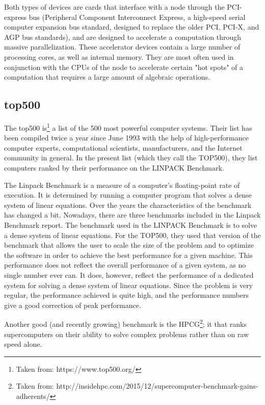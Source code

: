 \documentclass[paper=a4, fontsize=11pt]{scrartcl} %
\numberwithin{equation}{section} %
\numberwithin{figure}{section} %
\numberwithin{table}{section} %
\begin{document}
Both types of devices are cards that interface with a node through the PCI-express bus (Peripheral Component Interconnect Express, a high-speed serial computer expansion bus standard, designed to replace the older PCI, PCI-X, and AGP bus standards), and are designed to accelerate a computation through massive parallelization. These accelerator devices contain a large number of processing cores, as well as internal memory. They are most often used in conjunction with the CPUs of the node to accelerate certain "hot spots" of a computation that requires a large amount of algebraic operations.





\subsection{\textbf{top500}}

The top500 is\footnote{Taken from: https://www.top500.org/} a list of the 500 most powerful computer systems. Their list has been compiled twice a year since June 1993 with the help of high-performance computer experts, computational scientists, manufacturers, and the Internet community in general. In the present list (which they call the TOP500), they list computers ranked by their performance on the LINPACK Benchmark.

The Linpack Benchmark is a measure of a computer's floating-point rate of execution. It is determined by running a computer program that solves a dense system of linear equations. Over the years the characteristics of the benchmark has changed a bit. Nowadays, there are three benchmarks included in the Linpack Benchmark report. The benchmark used in the LINPACK Benchmark is to solve a dense system of linear equations. For the TOP500, they used that version of the benchmark that allows the user to scale the size of the problem and to optimize the software in order to achieve the best performance for a given machine. This performance does not reflect the overall performance of a given system, as no single number ever can. It does, however, reflect the performance of a dedicated system for solving a dense system of linear equations. Since the problem is very regular, the performance achieved is quite high, and the performance numbers give a good correction of peak performance.

Another good (and recently growing) benchmark is the HPCG\footnote{Taken from: http://insidehpc.com/2015/12/supercomputer-benchmark-gains-adherents/}; it  that ranks supercomputers on their ability to solve complex problems rather than on raw speed alone.
\end{document}
